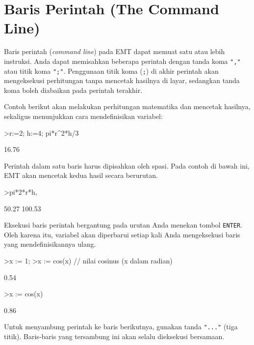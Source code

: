 \documentclass[a4paper,11pt,oneside,enabledeprecatedfontcommands]{scrbook}
\newenvironment{eulernotebook}{}{}
\newcommand{\eulersubheading}[1]{\section{#1}}
\newenvironment{eulercomment}{\par\medskip\noindent}{\par\medskip}
\begin{document}
\begin{eulernotebook}
\eulersubheading{Baris Perintah (The Command Line)}
\begin{eulercomment}
Baris perintah (\emph{command line}) pada EMT dapat memuat satu atau lebih instruksi. Anda dapat memisahkan beberapa perintah dengan tanda koma \texttt{","} atau titik koma \texttt{";"}. Penggunaan titik koma (\texttt{;}) di akhir perintah akan mengeksekusi perhitungan tanpa mencetak hasilnya di layar, sedangkan tanda koma boleh diabaikan pada perintah terakhir.

Contoh berikut akan melakukan perhitungan matematika dan mencetak hasilnya, sekaligus menunjukkan cara mendefinisikan variabel:
\end{eulercomment}
\begin{eulerprompt}
>r:=2; h:=4; pi*r^2*h/3
\end{eulerprompt}
\begin{euleroutput}
      16.76 
\end{euleroutput}
\begin{eulercomment}
Perintah dalam satu baris harus dipisahkan oleh spasi. Pada contoh di bawah ini, EMT akan mencetak kedua hasil secara berurutan.
\end{eulercomment}
\begin{eulerprompt}
>pi*2*r*h, %
\end{eulerprompt}
\begin{euleroutput}
      50.27 
     100.53 
\end{euleroutput}
\begin{eulercomment}
Eksekusi baris perintah bergantung pada urutan Anda menekan tombol \texttt{ENTER}. Oleh karena itu, variabel akan diperbarui setiap kali Anda mengeksekusi baris yang mendefinisikannya ulang.
\end{eulercomment}
\begin{eulerprompt}
>x := 1;
>x := cos(x) // nilai cosinus (x dalam radian)
\end{eulerprompt}
\begin{euleroutput}
       0.54 
\end{euleroutput}
\begin{eulerprompt}
>x := cos(x)
\end{eulerprompt}
\begin{euleroutput}
       0.86 
\end{euleroutput}
\begin{eulercomment}
Untuk menyambung perintah ke baris berikutnya, gunakan tanda \texttt{"..."} (tiga titik). Baris-baris yang tersambung ini akan selalu dieksekusi bersamaan.

\end{eulercomment}
\end{eulernotebook}
\end{document}
